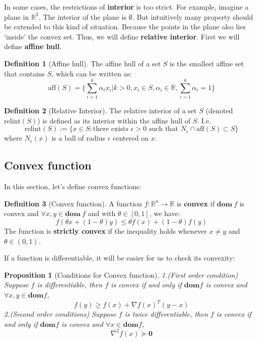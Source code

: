 \documentclass[
]{book}
\newtheorem{proposition}{Proposition}[chapter]
\theoremstyle{definition}
\newtheorem{definition}{Definition}[chapter]
\theoremstyle{definition}
\theoremstyle{definition}
\theoremstyle{definition}
\theoremstyle{remark}
\begin{document}
In some cases, the restrictions of \textbf{interior} is too strict. For example, imagine a plane in \(\mathbb{R}^3\). The interior of the plane is \(\emptyset\). But intuitively many property should be extended to this kind of situation. Because the points in the plane also lies `inside' the convex set. Thus, we will define \textbf{relative interior}. First we will define \textbf{affine hull}.

\begin{definition}[Affine hull]
\protect\hypertarget{def:affinehull}{}\label{def:affinehull}The affine hull of a set \(S\) is the smallest affine set that contains \(S\), which can be written as:
\[\text{aff}(S) = \{\sum_{i=1}^k\alpha_ix_i|k>0,x_i\in S,\alpha_i\in\mathbb{R},\sum_{i=1}^k\alpha_i=1\}\]
\end{definition}

\begin{definition}[Relative Interior]
\protect\hypertarget{def:relint}{}\label{def:relint}The relative interior of a set \(S\) (denoted \(\text{relint}(S)\)) is defined as its interior within the affine hull of \(S\). I.e.
\[\text{relint}(S):=\{x\in S: \text{there exists } \epsilon>0 \text{ such that }N_\epsilon \cap \text{aff}(S)\subset S\}\]
where \(N_\epsilon(x)\) is a ball of radius \(\epsilon\) centered on \(x\).
\end{definition}

\hypertarget{appconvex-theory-convexfunction}{%
\subsection{Convex function}\label{appconvex-theory-convexfunction}}

In this section, let's define convex functions:

\begin{definition}[Convex function]
\protect\hypertarget{def:defcvxfunc}{}\label{def:defcvxfunc}A function \(f:\mathbb{R}^n\to\mathbb{R}\) is \textbf{convex} if \(\textbf{dom}\ f\) is convex and \(\forall x,y\in \textbf{dom}\ f\) and with \(\theta \in [0,1]\), we have:\[f(\theta x +(1-\theta)y)\leq \theta f(x) + (1-\theta)f(y)\]
The function is \textbf{strictly convex} if the inequality holds whenever \(x\neq y\) and \(\theta\in (0,1)\).
\end{definition}

If a function is differentiable, it will be easier for us to check its convexity:

\begin{proposition}[Conditions for Convex function]
\protect\hypertarget{prp:decidecvx}{}\label{prp:decidecvx}1.(First order condition) Suppose \(f\) is differentiable, then \(f\) is convex if and only if \(\textbf{dom} f\) is convex and \(\forall x,y\in \textbf{dom} f\), \[f(y)\geq f(x) +\nabla f(x)^T(y-x)\]
2.(Second order conditions) Suppose \(f\) is twice differentiable, then \(f\) is convex if and only if \(\textbf{dom} f\) is convex and \(\forall x\in \textbf{dom} f\), \[\nabla^2 f(x) \succeq \textbf{0}\]
\end{proposition}
\end{document}
